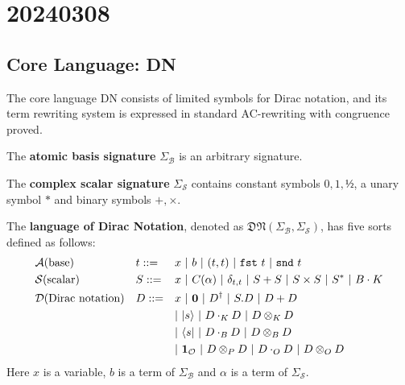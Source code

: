 \chapter{20240308}

\newcommand*{\unit}{\texttt{unit}}
\newcommand*{\utt}{\texttt{tt}}
\newcommand*{\fst}{\texttt{fst}}
\newcommand*{\snd}{\texttt{snd}}
\newcommand*{\reduce}{\ \triangleright\ }
\newcommand*{\reducefrom}{\ \triangleleft\ }

\newcommand*{\zeroK}[1]{\mathbf{0}_{\mathcal{K}(#1)}}
\newcommand*{\zeroB}[1]{\mathbf{0}_{\mathcal{B}(#1)}}
\newcommand*{\zeroO}[1]{\mathbf{0}_{\mathcal{O}(#1)}}


\section{Core Language: DN}

The core language DN consists of limited symbols for Dirac notation, and its term rewriting system is expressed in standard AC-rewriting with congruence proved.

\begin{definition} 
  The \textbf{atomic basis signature} $\Sigma_\mathcal{B}$ is an arbitrary signature.
\end{definition}

\begin{definition} 
  The \textbf{complex scalar signature} $\Sigma_\mathcal{S}$ contains constant symbols $0, 1, \text{½}$, a unary symbol $*$ and binary symbols $+, \times$.
\end{definition}

\begin{definition}
  The \textbf{language of Dirac Notation}, denoted as $\mathfrak{DN}(\Sigma_\mathcal{B}, \Sigma_\mathcal{S})$, has five sorts defined as follows:
  \begin{align*}
    & \mathcal{A} \textrm{(base)} && t ::= && x\ |\ b\ |\ (t, t)\ |\ \fst\ t\ |\ \snd\ t \\
    & \mathcal{S} \textrm{(scalar)} && S ::= && x\ |\ C(\alpha)\ |\ \delta_{t, t}\ |\ S + S\ |\ S \times S\ |\ S^*\ |\ B \cdot K \\
    & \mathcal{D} \textrm{(Dirac notation)} && D ::= && x\ |\ \mathbf{0}\ |\ D^\dagger\ |\ S.D\ |\ D + D \\
    & && && |\ \ket{s}\ |\ D \cdot_{K} D\ |\ D \otimes_{K} D \\
    & && && |\ \bra{s}\ |\ D \cdot_{B} D\ |\ D \otimes_{B} D \\
    & && && |\ \mathbf{1}_\mathcal{O}\ |\ D \otimes_P D\ |\ D \cdot_{O} D\ |\ D \otimes_{O} D
  \end{align*}
  Here $x$ is a variable, $b$ is a term of $\Sigma_\mathcal{B}$ and $\alpha$ is a term of $\Sigma_\mathcal{S}$.

\end{definition}

